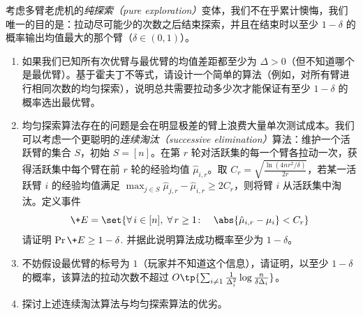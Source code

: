 \begin{problem}
考虑多臂老虎机的\emph{纯探索（pure exploration）}变体，我们不在乎累计懊悔，我们唯一的目的是：拉动尽可能少的次数之后结束探索，并且在结束时以至少 $1-\delta$ 的概率输出均值最大的那个臂（$\delta \in (0,1)$）。
\begin{enumerate}
    \item 如果我们已知所有次优臂与最优臂的均值差距都至少为 $\Delta > 0$（但不知道哪个是最优臂）。基于霍夫丁不等式，请设计一个简单的算法（例如，对所有臂进行相同次数的均匀探索），说明总共需要拉动多少次才能保证有至少 $1-\delta$ 的概率选出最优臂。
    \item 均匀探索算法存在的问题是会在明显极差的臂上浪费大量单次测试成本。我们可以考虑一个更聪明的\emph{连续淘汰（successive elimination）}算法：维护一个活跃臂的集合 $S$，初始 $S=[n]$。在第 $r$ 轮对活跃集的每一个臂各拉动一次，获得活跃集中每个臂在前 $r$ 轮的经验均值 $\hat{\mu}_{i,r}$。取 $C_r = \sqrt{\frac{\ln(4n r^2 / \delta)}{2r}}$，若某一活跃臂 $i$ 的经验均值满足 $\max_{j\in S}\hat{\mu}_{j,r} - \hat{\mu}_{i,r}\geq 2C_r$，则将臂 $i$ 从活跃集中淘汰。定义事件
    \[
        \+E = \set{ \forall\, i \in [n],\; \forall\, r \ge 1 \colon\quad \abs{\hat{\mu}_{i,r} - \mu_i} < C_r }
    \]
    请证明 $\Pr{\+E}\geq 1-\delta$. 并据此说明算法成功概率至少为 $1-\delta$。
    \item 不妨假设最优臂的标号为 $1$（玩家并不知道这个信息），请证明，以至少 $1-\delta$ 的概率，该算法的拉动次数不超过 $O\tp{\sum_{i\neq 1}\frac{1}{\Delta_i^2}\log\frac{n}{\delta \Delta_i}}$。
    \item 探讨上述连续淘汰算法与均匀探索算法的优劣。
\end{enumerate}
\end{problem}
